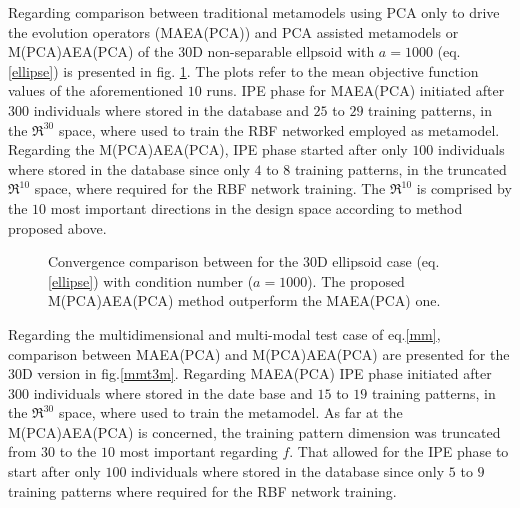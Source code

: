 Regarding comparison between traditional metamodels using PCA only to drive the evolution operators (MAEA(PCA)) and PCA assisted metamodels  or M(PCA)AEA(PCA) of the 30D non-separable ellpsoid with $a=1000$ (eq. \ref{ellipse}) is presented in fig. \ref{Ellt3-m}. The plots refer to the mean objective function values of the aforementioned $10$ runs. IPE phase for MAEA(PCA) initiated after $300$ individuals where stored in the database and $25$ to $29$ training patterns, in the $\Re^{30}$ space, where used to train the RBF networked employed as metamodel. Regarding the M(PCA)AEA(PCA), IPE phase started after only $100$ individuals where stored in the database since only $4$ to $8$ training patterns, in the truncated  $\Re^{10}$  space, where required for the RBF network training. The $\Re^{10}$ is comprised by the $10$ most important directions in the design space according to method proposed above. 

\begin{figure}[h!]
\begin{minipage}[b]{1\linewidth}
 \centering
\end{minipage}
\caption{Convergence comparison between for the 30D ellipsoid case (eq. \ref{ellipse}) with condition number ($a = 1000$). The proposed M(PCA)AEA(PCA) method outperform the MAEA(PCA) one.} 
\label{Ellt3-m}
\end{figure}


Regarding the multidimensional and multi-modal test case of eq.\ref{mm}, comparison between MAEA(PCA) and M(PCA)AEA(PCA) are presented for the 30D version in fig.\ref{mmt3m}. Regarding MAEA(PCA)  IPE phase initiated after $300$ individuals where stored in the date base and $15$ to $19$ training patterns, in the $\Re^{30}$ space, where used to train the  metamodel. As far at the M(PCA)AEA(PCA) is concerned, the training pattern dimension was truncated from $30$ to the $10$ most important regarding $f$. That allowed for the  IPE phase to start after only $100$ individuals where stored in the database since only $5$ to $9$ training patterns where required for the RBF network training.


